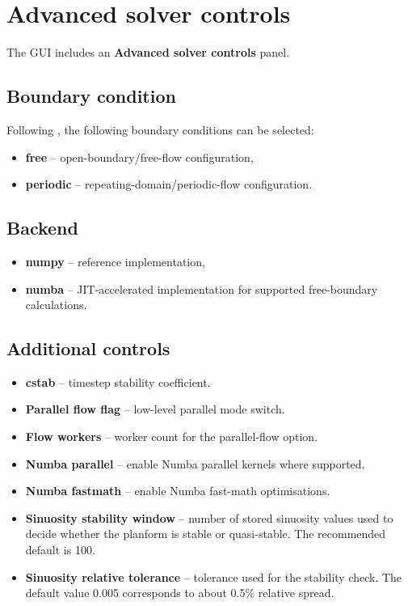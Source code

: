 \documentclass[11pt,a4paper]{article}
\begin{document}
\section{Advanced solver controls}

The GUI includes an \textbf{Advanced solver controls} panel.

\subsection{Boundary condition}

Following \cite{LanzoniSeminara2006}, the following boundary conditions can be selected:

\begin{itemize}[leftmargin=1.2em]
	\item \textbf{free} -- open-boundary/free-flow configuration,
	\item \textbf{periodic} -- repeating-domain/periodic-flow configuration.
\end{itemize}

\subsection{Backend}
\begin{itemize}[leftmargin=1.2em]
	\item \textbf{numpy} -- reference implementation,
	\item \textbf{numba} -- JIT-accelerated implementation for supported free-boundary calculations.
\end{itemize}

\subsection{Additional controls}

\begin{itemize}[leftmargin=1.2em]
	\item \textbf{cstab} -- timestep stability coefficient.
	\item \textbf{Parallel flow flag} -- low-level parallel mode switch.
	\item \textbf{Flow workers} -- worker count for the parallel-flow option.
	\item \textbf{Numba parallel} -- enable Numba parallel kernels where supported.
	\item \textbf{Numba fastmath} -- enable  Numba fast-math optimisations.
	\item \textbf{Sinuosity stability window} -- number of stored sinuosity values used to decide whether the planform is stable or quasi-stable. The recommended default is 100.
	\item \textbf{Sinuosity relative tolerance} -- tolerance used for the stability check. The default value 0.005 corresponds to about 0.5\% relative spread.
\end{itemize}
\end{document}

